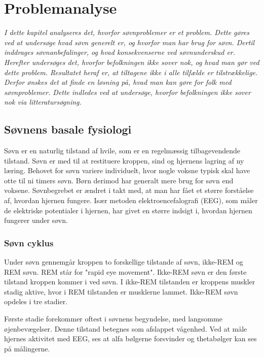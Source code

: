 \chapter{Problemanalyse}
\label{cha:Problemanalyse}

\textit{I dette kapitel analyseres det, hvorfor søvnproblemer er et problem. Dette gøres ved at undersøge hvad søvn generelt er, og hvorfor man har brug for søvn. Dertil inddrages søvnanbefalinger, og hvad konsekvenserne ved søvnunderskud er. Herefter undersøges det, hvorfor befolkningen ikke sover nok, og hvad man gør ved dette problem. Resultatet heraf er, at tiltagene ikke i alle tilfælde er tilstrækkelige. Derfor ønskes det at finde en løsning på, hvad man kan gøre for folk med søvnproblemer. Dette indledes ved at undersøge, hvorfor befolkningen ikke sover nok via litteratursøgning.}


\section{Søvnens basale fysiologi}\label{sec:Soevn_generelt}


Søvn er en naturlig tilstand af hvile, som er en regelmæssig tilbagevendende tilstand. Søvn er med til at restituere kroppen, sind og hjernens lagring af ny læring. Behovet for søvn variere individuelt, hvor nogle voksne typisk skal have otte til ni timers søvn. Børn derimod har generalt mere brug for søvn end voksene. Søvnbegrebet er ændret i takt med, at man har fået et større forståelse af, hvordan hjernen fungere. Især metoden elektroencefalografi (EEG), som måler de elektriske potentialer i hjernen, har givet en større indsigt i, hvordan hjernen fungerer under søvn. \cite{Hirshkowitz2015}

\subsection{Søvn cyklus}
Under søvn gennemgår kroppen to forskellige tilstande af søvn, ikke-REM og REM søvn. REM står for "rapid eye movement". Ikke-REM søvn er den første tilstand kroppen kommer i ved søvn. I ikke-REM tilstanden er kroppens muskler stadig aktive, hvor i REM tilstanden er musklerne lammet. Ikke-REM søvn opdeles i tre stadier. \cite{Mary2011}

Første stadie forekommer oftest i søvnens begyndelse, med langsomme øjenbevægelser. Denne tilstand betegnes som afslappet vågenhed. Ved at måle hjernes aktivitet med EEG, ses at alfa bølgerne forsvinder og thetabølger kan ses på målingerne. \cite{Mary2011}

